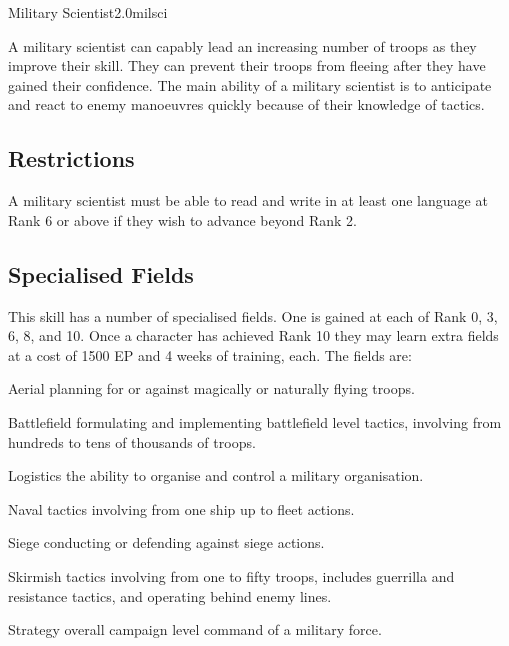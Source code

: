 \begin{skill}{Military Scientist}{2.0}{milsci}

A military scientist can capably lead an increasing number of troops
as they improve their skill. They can prevent their troops from
fleeing after they have gained their confidence. The main ability of a
military scientist is to anticipate and react to enemy manoeuvres
quickly because of their knowledge of tactics.

\subsection{Restrictions}

A military scientist must be able to read and write in at least one
language at Rank 6 or above if they wish to advance beyond Rank 2.

\subsection{Specialised Fields}

This skill has a number of specialised fields. One is gained at each
of Rank 0, 3, 6, 8, and 10. Once a character has achieved Rank 10 they
may learn extra fields at a cost of 1500 EP and 4 weeks of training,
each. The fields are:

\begin{Description}
\item[Aerial]
planning for or against magically or naturally flying troops.

\item[Battlefield]
formulating and implementing battlefield level tactics, involving from
hundreds to tens of thousands of troops.

\item[Logistics]
the ability to organise and control a military organisation.

\item[Naval]
tactics involving from one ship up to fleet actions.

\item[Siege]
conducting or defending against siege actions.

\item[Skirmish]
tactics involving from one to fifty troops, includes guerrilla and
resistance tactics, and operating behind enemy lines.

\item[Strategy]
overall campaign level command of a military force.


\end{Description}
\end{skill}

